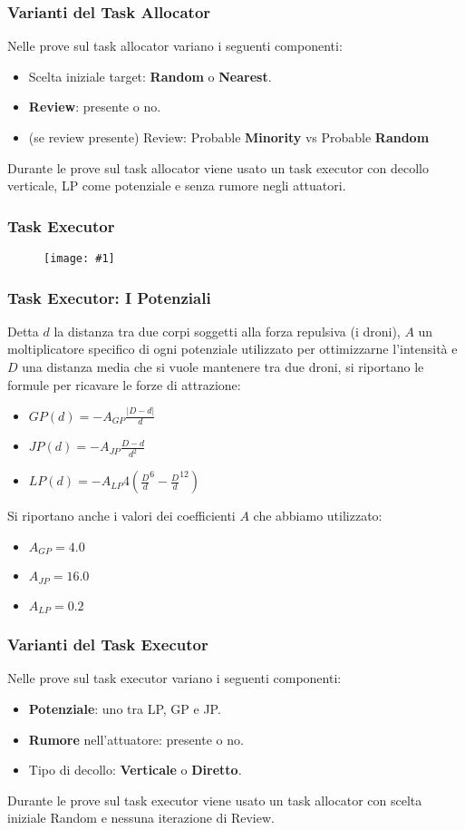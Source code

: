 \documentclass{beamer}
\newcommand{\putimage}[2] {
  \begin{figure}[H]
    \centering
    \texttt{[image: \#1]}
	\end{figure}
}
\begin{document}
\begin{frame}
\frametitle{Varianti del Task Allocator}
Nelle prove sul task allocator variano i seguenti componenti:

\begin{itemize}
  \item Scelta iniziale target: \textbf{Random} o \textbf{Nearest}.
  \item \textbf{Review}: presente o no.
  \item (se review presente) Review: Probable \textbf{Minority} vs Probable \textbf{Random}
\end{itemize}

Durante le prove sul task allocator viene usato un task executor con decollo verticale, LP come potenziale e senza rumore negli attuatori.
\end{frame}

\begin{frame}
\frametitle{Task Executor}
\putimage{images/task-executor.png}{0.99}
\end{frame}

\begin{frame}
\frametitle{Task Executor: I Potenziali}
Detta $d$ la distanza tra due corpi soggetti alla forza repulsiva (i droni), $A$ un moltiplicatore specifico di ogni potenziale utilizzato per ottimizzarne l'intensit\`a e $D$ una distanza media che si vuole mantenere tra due droni, si riportano le formule per ricavare le forze di attrazione:

\begin{itemize}
  \item $GP(d) = -A_{GP} \frac {|D - d|} {d}$
  \item $JP(d) = -A_{JP} \frac {D - d} {d^2}$
  \item $LP(d) = -A_{LP} 4 ({\frac {D} {d}}^6 - {\frac {D} {d}}^{12})$
\end{itemize}

Si riportano anche i valori dei coefficienti $A$ che abbiamo utilizzato:

\begin{itemize}
  \item $A_{GP} = 4.0$
  \item $A_{JP} = 16.0$
  \item $A_{LP} = 0.2$
\end{itemize}
\end{frame}

\begin{frame}
\frametitle{Varianti del Task Executor}
Nelle prove sul task executor variano i seguenti componenti:

\begin{itemize}
  \item \textbf{Potenziale}: uno tra LP, GP e JP.
  \item \textbf{Rumore} nell'attuatore: presente o no.
  \item Tipo di decollo: \textbf{Verticale} o \textbf{Diretto}.
\end{itemize}

Durante le prove sul task executor viene usato un task allocator con scelta iniziale Random e nessuna iterazione di Review.
\end{frame}
\end{document}
